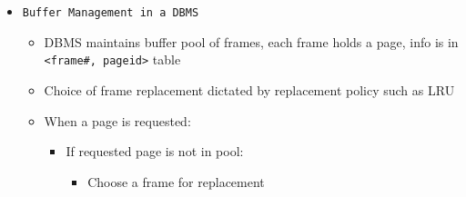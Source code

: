 \documentclass[landscape,8pt]{extarticle}
\newcommand{\code}{\lstinline}
\begin{document}
\begin{multicols}{4}
\begin{itemize}
\begin{itemize}
                  \item Level 3: Bit-interleaved parity
                        \begin{itemize}
                            \item Striping Unit: one bit (or byte) (one check disk)
                            \item Each read and write request involves all disks; disk array can process one request at a time
                        \end{itemize}
                  \item Level 4: Block-interleaved parity
                        \begin{itemize}
                            \item Striping unit: one disk block (one check disk)
                            \item Parallel reads possible for small requests, large requests can utilize full bandwidth
                            \item Writes involve modified block \emph{and} check disk
                        \end{itemize}
                  \item Level 5: Block-interleaved distributed parity
                        \begin{itemize}
                            \item Similar to RAID level 4 but parity blocks are distributed over all disks
                        \end{itemize}
              \end{itemize}
        \item \code{Buffer Management in a DBMS}
              \begin{itemize}
                  \item DBMS maintains buffer pool of frames, each frame holds a page, info is in \code{<frame#, pageid>} table
                  \item Choice of frame replacement dictated by replacement policy such as LRU
                  \item When a page is requested:
                        \begin{itemize}
                            \item If requested page is not in pool:
                                  \begin{itemize}
                                      \item Choose a frame for replacement

\end{itemize}
\end{itemize}
\end{itemize}
\end{itemize}
\end{multicols}
\end{document}
